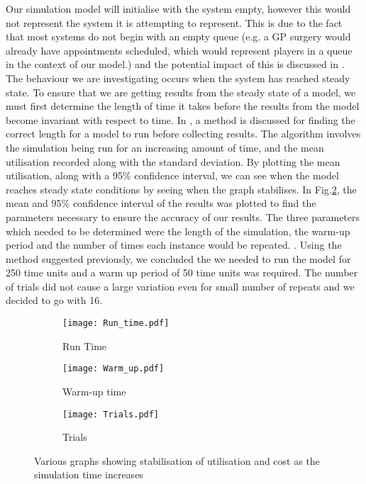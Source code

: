 \documentclass[12pt]{article}
\begin{document}
Our simulation model will initialise with the system empty, however this would not represent the system it is attempting to represent. This is due to the fact that most systems do not begin with an empty queue (e.g. a GP surgery would already have appointments scheduled, which would represent players in a queue in the context of our model.) and the potential impact of this is discussed in \cite{cite022}. The behaviour we are investigating occurs when the system has reached steady state.  To ensure that we are getting results from the steady state of a model, we must first determine the length of time it takes before the results from the model become invariant with respect to time. In \cite{cite013}, a method is discussed for finding the correct length for a model to run before collecting results. The algorithm involves the simulation being run for an increasing amount of time, and the mean utilisation recorded along with the standard deviation. By plotting the mean utilisation, along with a 95\% confidence interval, we can see when the model reaches steady state conditions by seeing when the graph stabilises. In Fig.\ref{fig:Warm}, the mean and 95\% confidence interval of the results was plotted to find the parameters necessary to ensure the accuracy of our results. The three parameters which needed to be determined were the length of the simulation, the warm-up period and the number of times each instance would be repeated. . Using the method suggested previously, we concluded the we needed to run the model for 250 time units and a warm up period of 50 time units was required. The number of trials did not cause a large variation even for small number of repeats and we decided to go with 16.

\begin{figure}[ht]

        \begin{subfigure}[b]{0.3\textwidth}
                \centering
                \texttt{[image: Run\_time.pdf]}
                \caption{Run Time}
                \label{fig:Run}
        \end{subfigure}
        \begin{subfigure}[b]{0.3\textwidth}
                \centering
                \texttt{[image: Warm\_up.pdf]}
                \caption{Warm-up time}
                \label{fig:Warm}
        \end{subfigure}
        \begin{subfigure}[b]{0.3\textwidth}
                \centering
                \texttt{[image: Trials.pdf]}
                \caption{Trials}
                \label{fig:Trials}
        \end{subfigure}
        \caption{Various graphs showing stabilisation of utilisation and cost as the simulation time increases }\label{fig:stable}
\end{figure}
\end{document}
